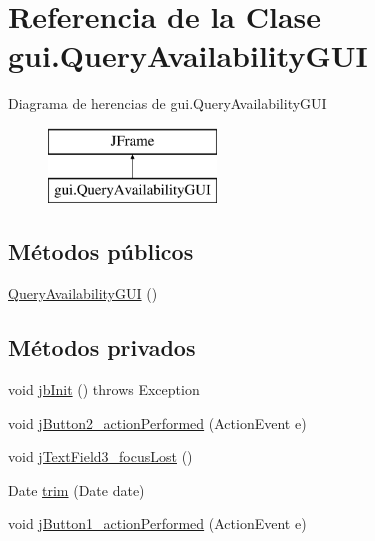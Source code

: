 \hypertarget{classgui_1_1_query_availability_g_u_i}{}\section{Referencia de la Clase gui.\+Query\+Availability\+G\+UI}
\label{classgui_1_1_query_availability_g_u_i}
Diagrama de herencias de gui.\+Query\+Availability\+G\+UI\begin{figure}[H]
\begin{center}
\leavevmode
\includegraphics[height=2.000000cm]{classgui_1_1_query_availability_g_u_i}
\end{center}
\end{figure}
\subsection*{Métodos públicos}
\begin{DoxyCompactItemize}
\item 
\mbox{\hyperlink{classgui_1_1_query_availability_g_u_i_a098dc51a0df6dd658bdd9a70231cbe3b}{Query\+Availability\+G\+UI}} ()
\end{DoxyCompactItemize}
\subsection*{Métodos privados}
\begin{DoxyCompactItemize}
\item 
void \mbox{\hyperlink{classgui_1_1_query_availability_g_u_i_aa5bad8dc44ac91fcd6b5f2b784c66e99}{jb\+Init}} ()  throws Exception   
\item 
void \mbox{\hyperlink{classgui_1_1_query_availability_g_u_i_aeeb46d43eeea68c2d4f256a93cb648c6}{j\+Button2\+\_\+action\+Performed}} (Action\+Event e)
\item 
void \mbox{\hyperlink{classgui_1_1_query_availability_g_u_i_ad6c1dfe2f2ac01aefd76483edc1d20a6}{j\+Text\+Field3\+\_\+focus\+Lost}} ()
\item 
Date \mbox{\hyperlink{classgui_1_1_query_availability_g_u_i_a1b9d107fe9049a6291e09f3c87c96b02}{trim}} (Date date)
\item 
void \mbox{\hyperlink{classgui_1_1_query_availability_g_u_i_adfddf3f903e7257285aba07de30efb83}{j\+Button1\+\_\+action\+Performed}} (Action\+Event e)
\end{DoxyCompactItemize}
